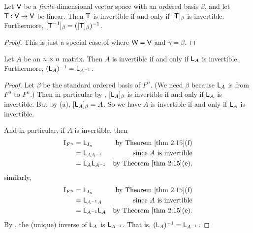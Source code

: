 \begin{corollary} \label{corollary 2.18.1}
Let \(\textsf{V}\) be a \emph{finite}-dimensional vector space with an ordered basis \(\beta\), and let \(\textsf{T} : \textsf{V} \to \textsf{V}\) be linear.
Then \(\textsf{T}\) is invertible if and only if \([\textsf{T}]_\beta\)
is invertible.
Furthermore, \([\textsf{T}^{-1}]_{\beta} = ([\textsf{T}]_{\beta})^{-1}\).
\end{corollary}

\begin{proof}
This is just a special case of  where \(\textsf{W} = \textsf{V}\) and \(\gamma = \beta\).
\end{proof}

\begin{corollary} \label{corollary 2.18.2}
Let \(A\) be an \(n \times n\) matrix.
Then \(A\) is invertible if and only if \(\textsf{L}_A\) is invertible. Furthermore, \((\textsf{L}_A)^{-1} = \textsf{L}_{A^{-1}}\).
\end{corollary}

\begin{proof}
Let \(\beta\) be the standard ordered basis of \(F^n\).
(We need \(\beta\) because \(\textsf{L}_A\) is from \(F^n\) to \(F^n\).)
Then in particular by , \([\textsf{L}_A]_{\beta}\) is invertible if and only if \(\textsf{L}_A\) is invertible.
But by (a), \([\textsf{L}_A]_{\beta} = A\).
So we have \(A\) is invertible if and only if \(\textsf{L}_A\) is invertible.

And in particular, if \(A\) is invertible, then
\begin{align*}
    \mathrm{I}_{F^n} & = \LMTRAN_{I_n} & \text{by \THM{2.15}(f)} \\
                     & = \LMTRAN_{A A^{-1}} & \text{since \(A\) is invertible} \\
                     & = \LMTRAN_A \LMTRAN_{A^{-1}} & \text{by \THM{2.15}(e)},
\end{align*}
similarly,
\begin{align*}
    \mathrm{I}_{F^n} & = \LMTRAN_{I_n} & \text{by \THM{2.15}(f)} \\
                     & = \LMTRAN_{A^{-1} A} & \text{since \(A\) is invertible} \\
                     & = \LMTRAN_{A^{-1}} \LMTRAN_A & \text{by \THM{2.15}(e)}.
\end{align*}
By , the (unique) inverse of \(\textsf{L}_A\) is \(\textsf{L}_{A^{-1}}\).
That is, \((\textsf{L}_A)^{-1} = \textsf{L}_{A^{-1}}\).
\end{proof}

